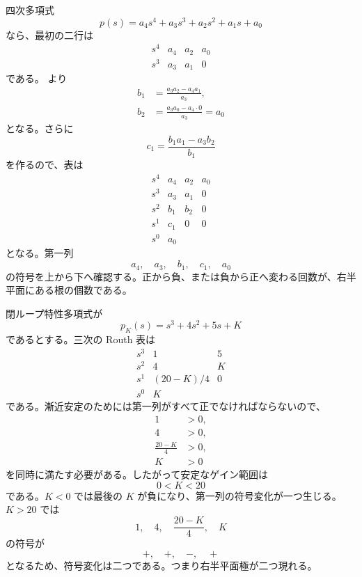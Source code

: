 四次多項式
\begin{equation}
  p(s)=a_4s^4+a_3s^3+a_2s^2+a_1s+a_0
\end{equation}
なら、最初の二行は
\begin{equation}
\begin{array}{c|ccc}
s^4&a_4&a_2&a_0\\
s^3&a_3&a_1&0
\end{array}
\end{equation}
である。 より
\begin{align}
  b_1&=\frac{a_3a_2-a_4a_1}{a_3},\\
  b_2&=\frac{a_3a_0-a_4\cdot0}{a_3}=a_0
\end{align}
となる。さらに
\begin{equation}
  c_1=\frac{b_1a_1-a_3b_2}{b_1}
\end{equation}
を作るので、表は
\begin{equation}
\begin{array}{c|ccc}
s^4&a_4&a_2&a_0\\
s^3&a_3&a_1&0\\
s^2&b_1&b_2&0\\
s^1&c_1&0&0\\
s^0&a_0&&
\end{array}
\end{equation}
となる。第一列
\begin{equation}
  a_4,\quad a_3,\quad b_1,\quad c_1,\quad a_0
\end{equation}
の符号を上から下へ確認する。正から負、または負から正へ変わる回数が、右半平面にある根の個数である。

\begin{example}[ゲイン範囲の判定]
閉ループ特性多項式が
\begin{equation}
  p_K(s)=s^3+4s^2+5s+K
\end{equation}
であるとする。三次の Routh 表は
\begin{equation}
\begin{array}{c|cc}
s^3&1&5\\
s^2&4&K\\
s^1&(20-K)/4&0\\
s^0&K&
\end{array}
\end{equation}
である。漸近安定のためには第一列がすべて正でなければならないので、
\begin{align}
  1&>0,\\
  4&>0,\\
  \frac{20-K}{4}&>0,\\
  K&>0
\end{align}
を同時に満たす必要がある。したがって安定なゲイン範囲は
\begin{equation}
  0<K<20
\end{equation}
である。$K<0$ では最後の $K$ が負になり、第一列の符号変化が一つ生じる。$K>20$ では
\begin{equation}
  1,\quad 4,\quad \frac{20-K}{4},\quad K
\end{equation}
の符号が
\begin{equation}
  +,\quad +,\quad -,\quad +
\end{equation}
となるため、符号変化は二つである。つまり右半平面極が二つ現れる。
\end{example}


